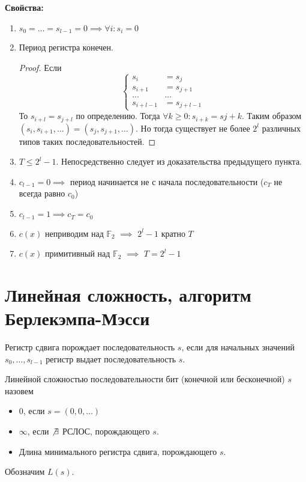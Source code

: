 {\bfseries Свойства:}
\begin{enumerate}
\item $s_0 = \ldots = s_{l-1} = 0 \implies \forall i \colon s_i = 0$
\item Период регистра конечен.
\begin{proof}
Если $$
\left\{\begin{array}{rl} s_i &= s_j \\
                         s_{i+1} &= s_{j+1} \\
                         \ldots & \ldots \\
                         s_{i+l-1} &= s_{j+l-1} 
        \end{array}\right.$$
   То $s_{i+l} = s_{j+l}$ по определению. Тогда $\forall k \ge 0 \colon s_{i+k} = s{j+k}$.
   Таким образом $(s_i, s_{i+1}, \ldots) = (s_j, s_{j+1}, \ldots)$. Но
   тогда существует не более $2^l$ различных типов таких последовательностей.

\end{proof}
\item $T \le 2^l - 1$. Непосредственно следует из доказательства предыдущего пункта.
\item $c_{l-1} = 0 \implies $ период начинается не с начала последовательности
      ($c_T$ не всегда равно $c_0$)
\item $c_{l-1} = 1 \implies c_T = c_0$
\item $c(x)$ неприводим над $\mathbb{F}_2$ $\implies$ $2^l-1$ кратно $T$
\item $c(x)$ примитивный над $\mathbb{F}_2$ $\implies$ $T = 2^l - 1$
\end{enumerate}

\section{Линейная сложность, алгоритм Берлекэмпа-Мэсси}
\begin{definition}
Регистр сдвига порождает последовательность $s$, если для начальных
значений $s_0, \ldots, s_{l-1}$ регистр выдает последовательность $s$.
\end{definition}

\begin{definition}
Линейной сложностью последовательности бит (конечной или 
бесконечной) $s$ назовем
\begin{itemize}
\item $0$, если $s = (0, 0, \ldots)$
\item $\infty$, если $\not\exists$ РСЛОС, порождающего $s$.
\item Длина минимального регистра сдвига, порождающего $s$.
\end{itemize}

Обозначим $L(s)$.
\end{definition}

